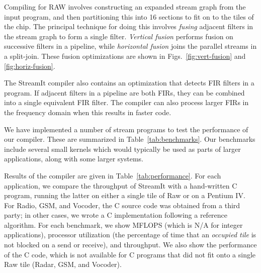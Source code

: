 Compiling for RAW involves constructing an expanded stream graph from
the input program, and then partitioning this into 16 sections to fit
on to the tiles of the chip\cite{gordon02}.  The principal technique
for doing this involves \emph{fusing} adjacent filters in the stream
graph to form a single filter.  \emph{Vertical fusion} performs fusion
on successive filters in a pipeline, while \emph{horizontal fusion}
joins the parallel streams in a split-join.  These fusion
optimizations are shown in Figs.~\ref{fig:vert-fusion} and
\ref{fig:horiz-fusion}.

The StreamIt compiler also contains an optimization that detects FIR
filters in a program\cite{lamb03}.  If adjacent filters in a pipeline
are both FIRs, they can be combined into a single equivalent FIR
filter.  The compiler can also process larger FIRs in the frequency
domain when this results in faster code.

We have implemented a number of stream programs to test the
performance of our compiler.  These are summarized in
Table~\ref{tab:benchmarks}.  Our benchmarks include several small
kernels which would typically be used as parts of larger applications,
along with some larger systems.

Results of the compiler are given in Table~\ref{tab:performance}.
For each application, we compare the throughput of StreamIt with a
hand-written C program, running the latter on either a single tile of
Raw or on a Pentium IV.  For Radio, GSM, and Vocoder, the C source
code was obtained from a third party; in other cases, we wrote a C
implementation following a reference algorithm.  For each benchmark,
we show MFLOPS (which is N/A for integer applications), processor
utilization (the percentage of time that an {\it occupied tile} is not
blocked on a send or receive), and throughput.  We also show the
performance of the C code, which is not available for C programs that
did not fit onto a single Raw tile (Radar, GSM, and Vocoder).

